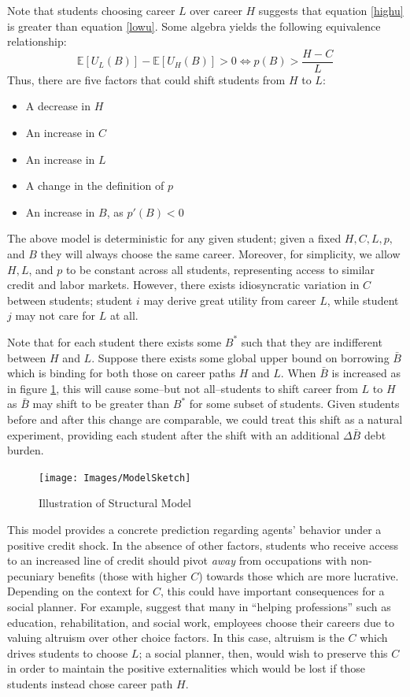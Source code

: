 \documentclass[12pt]{article}
\begin{document}
	Note that students choosing career $L$ over career $H$ suggests that equation \ref{highu} is greater than equation \ref{lowu}. Some algebra yields the following equivalence relationship: 
	$$\mathbb{E}\left[U_L(B)\right] - \mathbb{E}\left[U_H(B)\right] > 0 \iff p(B) > \frac{H - C}{L} \label{choicecon}$$ 
	Thus, there are five factors that could shift students from $H$ to $L$:
	\begin{itemize}
		\singlespacing
		\item A decrease in $H$
		\item An increase in $C$
		\item An increase in $L$
		\item A change in the definition of $p$
		\item An increase in $B$, as $p'(B) < 0$
	\end{itemize}

	The above model is deterministic for any given student; given a fixed $H, C, L, p,$ and $B$ they will always choose the same career. Moreover, for simplicity, we allow $H, L$, and $p$ to be constant across all students, representing access to similar credit and labor markets. However, there exists idiosyncratic variation in $C$ between students; student $i$ may derive great utility from career $L$, while student $j$ may not care for $L$ at all.

	Note that for each student there exists some $B^*$ such that they are indifferent between $H$ and $L$. Suppose there exists some global upper bound on borrowing $\bar{B}$ which is binding for both those on career paths $H$ and $L$. When $\bar{B}$ is increased as in figure \ref{struc}, this will cause some--but not all--students to shift career from $L$ to $H$ as $\bar{B}$ may shift to be greater than $B^*$ for some subset of students. Given students before and after this change are comparable, we could treat this shift as a natural experiment, providing each student after the shift with an additional $\Delta\bar{B}$ debt burden. 
	
		
	\begin{figure}
		\centering
		\caption{Illustration of Structural Model}
		\label{struc}
		\texttt{[image: Images/ModelSketch]}
	\end{figure}

	This model provides a concrete prediction regarding agents' behavior under a positive credit shock. In the absence of other factors, students who receive access to an increased line of credit should pivot \emph{away} from occupations with non-pecuniary benefits (those with higher $C$) towards those which are more lucrative. Depending on the context for $C$, this could have important consequences for a social planner. For example, \textcite{benshem1991} suggest that many in ``helping professions'' such as education, rehabilitation, and social work, employees choose their careers due to valuing altruism over other choice factors. In this case, altruism is the $C$ which drives students to choose $L$; a social planner, then, would wish to preserve this $C$ in order to maintain the positive externalities which would be lost if those students instead chose career path $H$.
\end{document}
